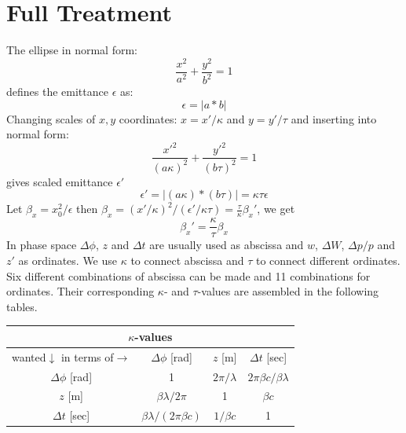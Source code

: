 \documentclass{article}
\begin{document}
\section{Full Treatment}
The ellipse in normal form:
\begin{equation}
\frac{x^{2}}{a^{2}}+\frac{y^{2}}{b^{2}}= 1 \label{}
\end{equation}
defines the emittance $\epsilon$ as:
\begin{equation}
\epsilon= |a*b| \label{}
\end{equation}
Changing scales of $x,y$ coordinates:
$x= x'/\kappa$ and $y=y'/\tau$ and inserting into normal form:
\begin{equation}
\frac{x'^{2}}{(a\kappa)^{2}}+\frac{y'^{2}}{(b\tau)^{2}} = 1 \label{}
\end{equation}
gives scaled emittance $\epsilon'$ 
\begin{equation}
\epsilon'= |(a \kappa)*(b\tau)| = \kappa \tau \epsilon \label{}
\end{equation}
Let $\beta_x = x_0^{2}/\epsilon$ then $\beta_x = (x'/\kappa)^{2} / (\epsilon'/\kappa\tau) = \frac{\tau}{\kappa} \beta_x'$, we get
\begin{equation}
\beta_x' = \frac{\kappa}{\tau} \beta_x \label{}
\end{equation}
In phase space $\Delta\phi$, $z$ and $\Delta t$ are usually used as abscissa and $w$, $\Delta W$, $\Delta p/p$ and $z'$ as ordinates.
We use $\kappa$ to connect abscissa and $\tau$ to connect different ordinates. Six different combinations of abscissa can be made and 11 combinations
for ordinates. Their corresponding $\kappa$- and $\tau$-values are assembled in the following tables. \\

\begin{tabular}{|c|c|c|c|}
\hline
\multicolumn{4}{|c|}{\textbf{$\kappa$-values}} \\
\hline
wanted$\downarrow$ in terms of$\rightarrow$ & $\Delta\phi$ [rad]          &$z$ [m]        &$\Delta t$ [sec]    \\
\hline
$\Delta\phi$ [rad]                          &1                            &$2\pi/\lambda$ &$2\pi\beta c/\beta\lambda$ \\
$z$ [m]                                     &$\beta\lambda/2\pi$          &1              &$\beta c$  \\
$\Delta t$ [sec]                            &$\beta\lambda/(2\pi\beta c)$ &$1/\beta c$    &1   \\
\hline
\end{tabular} \\ \\
\end{document}

